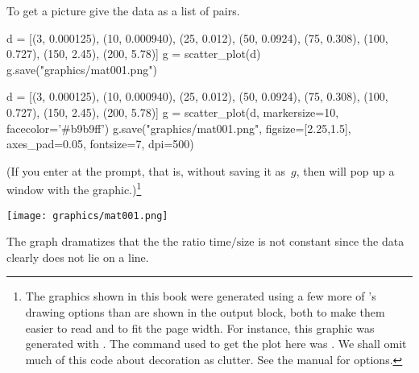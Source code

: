 To get a picture give \Sage{} the data as a list of pairs.
\begin{sageoutput}
d = [(3, 0.000125), (10, 0.000940), (25, 0.012),  
     (50, 0.0924), (75, 0.308), (100, 0.727), 
     (150, 2.45), (200, 5.78)]
g = scatter_plot(d)  
g.save("graphics/mat001.png")            
\end{sageoutput}
\begin{sagesilent}
d = [(3, 0.000125), (10, 0.000940), (25, 0.012),  
     (50, 0.0924), (75, 0.308), (100, 0.727), 
     (150, 2.45), (200, 5.78)]
g = scatter_plot(d, markersize=10, facecolor='#b9b9ff')
g.save("graphics/mat001.png", figsize=[2.25,1.5], axes_pad=0.05, fontsize=7, dpi=500)              
\end{sagesilent}
\noindent
(If you enter  at the prompt, that is, 
without saving it as~$g$, then \Sage{} will pop up a window with the
graphic.)\footnote{The graphics shown in this book were generated using a few 
more of \protect\Sage's drawing options than are shown in the output block,
both to make them easier to read and to fit the page width.
For instance, this graphic was generated with 
\protect{}.
The \protect\Sage{} command used to get the plot here was 
\protect{}.
We shall omit much of this code about decoration as clutter.
See the \protect\Sage{} manual for \protect{} options.}
\begin{center}
  \texttt{[image: graphics/mat001.png]}
\end{center}
The graph dramatizes that the the ratio $\text{time}/\text{size}$
is not constant
since the data clearly does not lie on a line.

